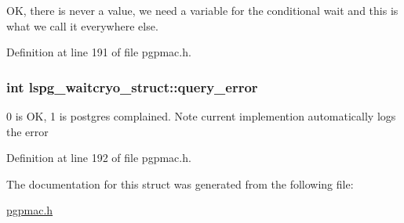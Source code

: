 O\-K, there is never a value, we need a variable for the conditional wait and this is what we call it everywhere else. 



Definition at line 191 of file pgpmac.\-h.

\hypertarget{structlspg__waitcryo__struct_a562f641a86142566aa67dc41f2676fb7}{
\subsubsection[{query\-\_\-error}]{\setlength{\rightskip}{0pt plus 5cm}int lspg\-\_\-waitcryo\-\_\-struct\-::query\-\_\-error}}\label{structlspg__waitcryo__struct_a562f641a86142566aa67dc41f2676fb7}


0 is O\-K, 1 is postgres complained. Note current implemention automatically logs the error 



Definition at line 192 of file pgpmac.\-h.



The documentation for this struct was generated from the following file\-:\begin{DoxyCompactItemize}
\item 
\hyperlink{pgpmac_8h}{pgpmac.\-h}\end{DoxyCompactItemize}
